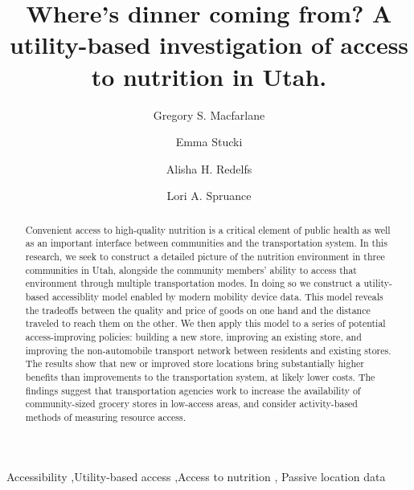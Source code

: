 \documentclass[
  letterpaper,
  number,
  review,
  3p]{elsarticle}
\begin{document}
\begin{frontmatter}
\title{Where's dinner coming from? A utility-based investigation of
access to nutrition in Utah.}
\author[1]{Gregory S. Macfarlane%
%
}
\author[1]{Emma Stucki%
%
}

\author[2]{Alisha H. Redelfs%
%
}

\author[2]{Lori A. Spruance%
%
}







        
\begin{abstract}
Convenient access to high-quality nutrition is a critical element of
public health as well as an important interface between communities and
the transportation system. In this research, we seek to construct a
detailed picture of the nutrition environment in three communities in
Utah, alongside the community members' ability to access that
environment through multiple transportation modes. In doing so we
construct a utility-based accessiblity model enabled by modern mobility
device data. This model reveals the tradeoffs between the quality and
price of goods on one hand and the distance traveled to reach them on
the other. We then apply this model to a series of potential
access-improving policies: building a new store, improving an existing
store, and improving the non-automobile transport network between
residents and existing stores. The results show that new or improved
store locations bring substantially higher benefits than improvements to
the transportation system, at likely lower costs. The findings suggest
that transportation agencies work to increase the availability of
community-sized grocery stores in low-access areas, and consider
activity-based methods of measuring resource access.
\end{abstract}





\begin{keyword}
    Accessibility \sep Utility-based access \sep Access to
nutrition \sep 
    Passive location data
\end{keyword}
\end{frontmatter}
    
\end{document}
